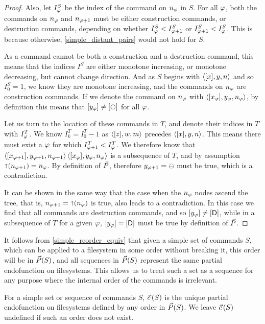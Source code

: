 \begin{proof}
Also, let $I^S_\varphi$ be the index of the command on $n_\varphi$ in $S$.
For all $\varphi$, both the commands on $n_\varphi$ and $n_{\varphi+1}$ must be either
construction commands, or destruction commands, depending on
whether $I^S_\varphi<I^S_{\varphi+1}$ or $I^S_{\varphi+1}<I^S_\varphi$.
This is because otherwise, \cref{simple_distant_pairs} would not hold for $S$.

As a command cannot be both a construction and a destruction command,
this means that the indices $I^S$ are either monotone increasing, or monotone
decreasing, but cannot change direction.
And as $S$ begins with $\langle{[x],y,n}\rangle$ and so $I^S_0=1$, we know they are monotone increasing,
and the commands on $n_\varphi$ are construction commands.
If we denote the command on $n_\varphi$ with $\langle{[x_\varphi],y_\varphi,n_\varphi}\rangle$,
by definition this means that $[y_\varphi]\neq[\ominus]$ for all $\varphi$.

Let us turn to the location of these commands in $T$,
and denote their indices in $T$ with $I^T_\varphi$.
We know $I^T_k=I^T_0-1$ as $\langle{[z],w,m}\rangle$ precedes $\langle{[x],y,n}\rangle$.
This means there must exist a $\varphi$ for which $I^T_{\varphi+1}<I^T_\varphi$.
We therefore know that
$\langle{[x_{\varphi+1}],y_{\varphi+1},n_{\varphi+1}}\rangle \, \langle{[x_\varphi],y_\varphi,n_\varphi}\rangle$
is a subsequence of $T$, and by assumption $\mathord{\shortuparrow}({n_{\varphi+1}})=n_\varphi$.
By definition of $\vec{P}$, therefore $y_{\varphi+1}=\ominus$ must be true,
which is a contradiction.

It can be shown in the same way
that the case when the $n_\varphi$ nodes ascend the tree,
that is, $n_{\varphi+1}=\mathord{\shortuparrow}({n_\varphi})$ is true, also leads to a contradiction.
In this case we find that all commands are destruction commands,
and so $[y_\varphi]\neq[\mathsf{D}]$, while in a subsequence of $T$ for a given $\varphi$,
$[y_\varphi]=[\mathsf{D}]$ must be true by definition of $\vec{P}$.
\end{proof}


It follows from \cref{simple_reorder_equiv} that given a simple set of commands $S$,
which can be applied to a filesystem in some order without breaking it,
this order will be in $\vec{P}({S})$,
and all sequences in $\vec{P}({S})$
represent the same partial endofunction on filesystems.
This allows us to treat such a set as a sequence for any purpose
where the internal order of the commands is irrelevant.
\begin{mydef}[$\ordp{S}$]
For a simple set or sequence of commands $S$,
$\ordp{S}$ is the unique partial endofunction on filesystems
defined by any order in $\vec{P}({S})$.
We leave $\ordp{S}$ undefined if such an order does not exist.
\end{mydef}


